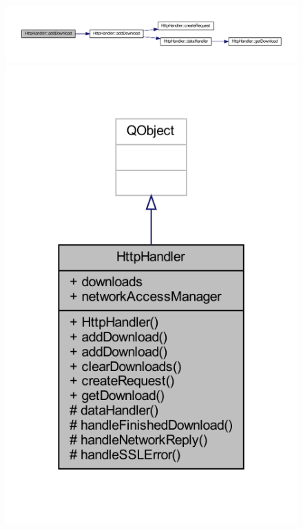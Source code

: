 \documentclass{article}
\begin{document}
\begin{figure}
    \begin{sideways}
        \centering
        \includegraphics[width=\textheight]{classPdfs/classHttpHandler_ade64572cb953620fd483bc669c1e9178_cgraph.pdf} 
    \end{sideways}
    \includegraphics[]{classPdfs/classHttpHandler.pdf}
\end{figure}
\end{document}
